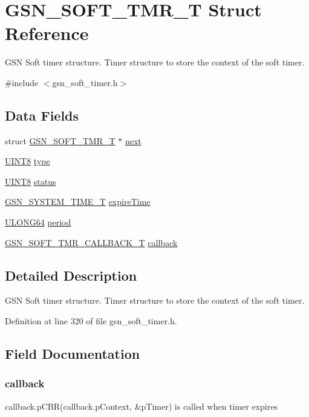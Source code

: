 \hypertarget{a00229}{
\section{GSN\_\-SOFT\_\-TMR\_\-T Struct Reference}
\label{a00229}
}


GSN Soft timer structure. Timer structure to store the context of the soft timer.  




{\ttfamily \#include $<$gsn\_\-soft\_\-timer.h$>$}

\subsection*{Data Fields}
\begin{DoxyCompactItemize}
\item 
struct \hyperlink{a00229}{GSN\_\-SOFT\_\-TMR\_\-T} $\ast$ \hyperlink{a00229_a200ef44ce9f15e4c6203125811b9e5de}{next}
\item 
\hyperlink{a00660_gab27e9918b538ce9d8ca692479b375b6a}{UINT8} \hyperlink{a00229_a631bceb766461ab7475c7ed56717aac8}{type}
\item 
\hyperlink{a00660_gab27e9918b538ce9d8ca692479b375b6a}{UINT8} \hyperlink{a00229_ac4f6d5d1544a8d2c1309479ffe1b61ab}{status}
\item 
\hyperlink{a00673_gad1e755eb904493a09bf8df25a4519bf0}{GSN\_\-SYSTEM\_\-TIME\_\-T} \hyperlink{a00229_ad9a0a5a2ce626900fa5f3da2650594e3}{expireTime}
\item 
\hyperlink{a00660_ga28961430434ccabca6862ea93fe9a15b}{ULONG64} \hyperlink{a00229_a3b84f6ec4bf7d6dca6c041f42394e437}{period}
\item 
\hyperlink{a00228}{GSN\_\-SOFT\_\-TMR\_\-CALLBACK\_\-T} \hyperlink{a00229_a35a3c1463439c448c32fb10f044467a7}{callback}
\end{DoxyCompactItemize}


\subsection{Detailed Description}
GSN Soft timer structure. Timer structure to store the context of the soft timer. 

Definition at line 320 of file gsn\_\-soft\_\-timer.h.



\subsection{Field Documentation}
\hypertarget{a00229_a35a3c1463439c448c32fb10f044467a7}{
\subsubsection[{callback}]{ {\bf callback}}}
\label{a00229_a35a3c1463439c448c32fb10f044467a7}
callback.pCBR(callback.pContext, \&pTimer) is called when timer expires 

